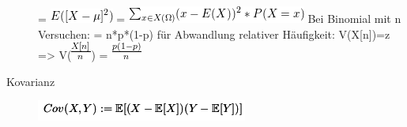 \documentclass[11pt]{article}
\begin{document}
\begin{description}
            = \includegraphics[width=.9\linewidth]{201301ad-0049294949gkk.png} = \includegraphics[width=.9\linewidth]{201301ad-0054574949tuq.png}
             Bei Binomial mit n Versuchen: 
                = n*p*(1-p)
                für Abwandlung relativer Häufigkeit: V(X[n])=z 
                   => V(\includegraphics[width=.9\linewidth]{201301ad-1614254949GeA.png}) = \includegraphics[width=.9\linewidth]{201301ad-1613574949UUx.png}
\item[Kovarianz] \includegraphics[width=.9\linewidth]{zettelkasten.org_20121229_220016_149760At.png} 

\end{description}
\end{document}
